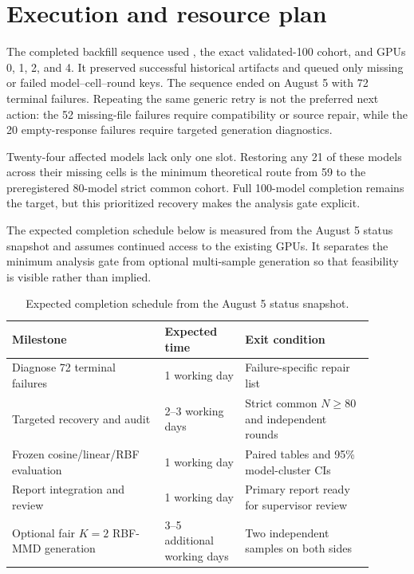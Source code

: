\documentclass[11pt,a4paper]{article}
\begin{document}
\clearpage

\section{Execution and resource plan}

The completed backfill sequence used
, the exact validated-100
cohort, and GPUs 0, 1, 2, and 4. It preserved successful historical artifacts
and queued only missing or failed model--cell--round keys. The sequence ended
on August 5 with 72 terminal failures. Repeating the same generic retry is not
the preferred next action: the 52 missing-file failures require compatibility
or source repair, while the 20 empty-response failures require targeted
generation diagnostics.

Twenty-four affected models lack only one slot. Restoring any 21 of these
models across their missing cells is the minimum theoretical route from 59 to
the preregistered 80-model strict common cohort. Full 100-model completion
remains the target, but this prioritized recovery makes the analysis gate
explicit.

The expected completion schedule below is measured from the August 5 status
snapshot and assumes continued access to the existing GPUs. It separates the
minimum analysis gate from optional multi-sample generation so that feasibility
is visible rather than implied.

\begin{table}[htbp]
\centering
\small
\caption{Expected completion schedule from the August 5 status snapshot.}
\label{tab:completion-schedule}
\begin{tabular}{p{0.38\linewidth}p{0.20\linewidth}p{0.32\linewidth}}
\toprule
Milestone & Expected time & Exit condition \\
\midrule
Diagnose 72 terminal failures & 1 working day & Failure-specific repair list \\
Targeted recovery and audit & 2--3 working days & Strict common $N\geq80$ and independent rounds \\
Frozen cosine/linear/RBF evaluation & 1 working day & Paired tables and 95\% model-cluster CIs \\
Report integration and review & 1 working day & Primary report ready for supervisor review \\
Optional fair $K=2$ RBF-MMD generation & 3--5 additional working days & Two independent samples on both sides \\
\bottomrule
\end{tabular}
\end{table}
\end{document}
